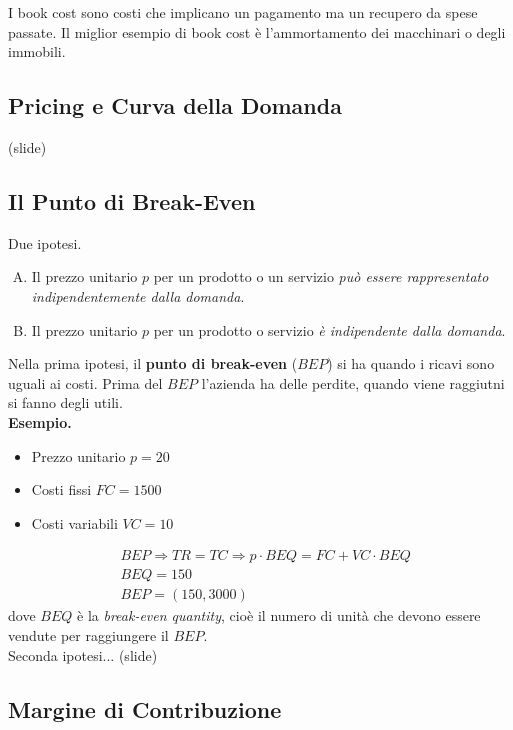 \documentclass[a4paper,portrait,12pt]{article}
\theoremstyle{definition}
\begin{document}
I book cost sono costi che implicano un pagamento ma un recupero da spese passate.
Il miglior esempio di book cost è l'ammortamento dei macchinari o degli immobili.

\subsection{Pricing e Curva della Domanda}
(slide)

\subsection{Il Punto di Break-Even}

Due ipotesi.
\begin{enumerate}[A.]
\item Il prezzo unitario $p$ per un prodotto o un servizio \emph{può essere rappresentato indipendentemente dalla domanda}.
\item Il prezzo unitario $p$ per un prodotto o servizio \emph{è indipendente dalla domanda}.
\end{enumerate}

Nella prima ipotesi, il \textbf{punto di break-even} ($BEP$) si ha quando i ricavi sono uguali ai costi.
Prima del $BEP$ l'azienda ha delle perdite, quando viene raggiutni si fanno degli utili.\\

\textbf{Esempio.}
\begin{itemize}
\item Prezzo unitario $p = 20$
\item Costi fissi $FC = 1500$
\item Costi variabili $VC = 10$ 
\end{itemize}

\begin{align*}
&BEP \Rightarrow TR = TC \Rightarrow p \cdot BEQ = FC + VC \cdot BEQ\\
&BEQ = 150\\
&BEP = (150, 3000)
\end{align*}
dove $BEQ$ è la \emph{break-even quantity}, cioè il numero di unità che devono essere vendute per raggiungere il $BEP$.\\

Seconda ipotesi... (slide)

\subsection{Margine di Contribuzione}
\end{document}
